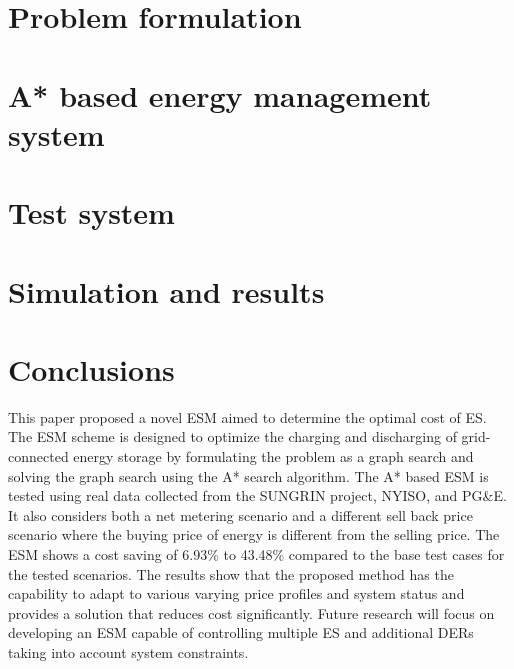 \documentclass[journal]{IEEEtran}
\begin{document}
\section{Problem formulation} \label{formulation}


\section{A* based energy management system} \label{A*}


\section{Test system} \label{sys}


\section{Simulation and results}


\section{Conclusions}
This paper proposed a novel ESM aimed to determine the optimal cost of ES. The ESM scheme is designed to optimize the charging and discharging of grid-connected energy storage by formulating the problem as a graph search and solving the graph search using the A* search algorithm. The A* based ESM is tested using real data collected from the SUNGRIN project, NYISO, and PG\&E. It also considers both a net metering scenario and a different sell back price scenario where the buying price of energy is different from the selling price. The ESM shows a cost saving of 6.93\% to 43.48\% compared to the base test cases for the tested scenarios. The results show that the proposed method has the capability to adapt to various varying price profiles and system status and provides a solution that reduces cost significantly. Future research will focus on developing an ESM capable of controlling multiple ES and additional DERs taking into account system constraints.




\ifCLASSOPTIONcaptionsoff
  \newpage
\fi
\end{document}

